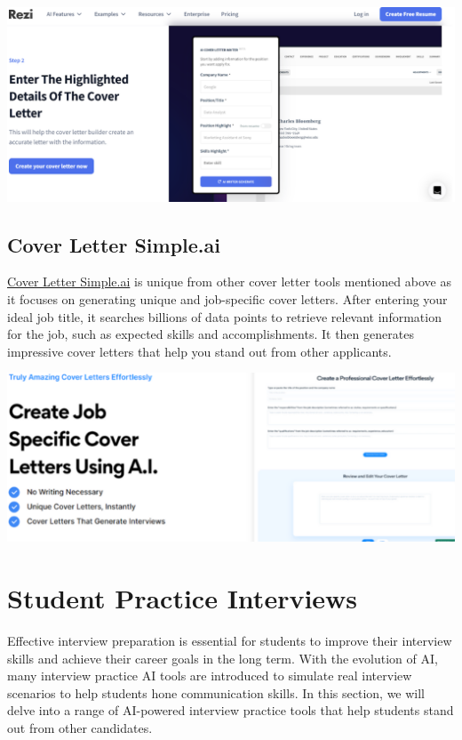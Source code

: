 \documentclass[
]{book}
\begin{document}
\includegraphics[width=5.5in,height=\textheight]{Rezi pic.png}

\hypertarget{cover-letter-simple.ai}{%
\section{Cover Letter Simple.ai}\label{cover-letter-simple.ai}}

\href{https://coverlettersimple.ai/}{Cover Letter Simple.ai} is unique from other cover letter tools mentioned above as it focuses on generating unique and job-specific cover letters. After entering your ideal job title, it searches billions of data points to retrieve relevant information for the job, such as expected skills and accomplishments. It then generates impressive cover letters that help you stand out from other applicants.

\includegraphics[width=6.80208in,height=\textheight]{coverlettsimpleai pic.png}

\hypertarget{student-practice-interviews}{%
\chapter{Student Practice Interviews}\label{student-practice-interviews}}

Effective interview preparation is essential for students to improve their interview skills and achieve their career goals in the long term. With the evolution of AI, many interview practice AI tools are introduced to simulate real interview scenarios to help students hone communication skills. In this section, we will delve into a range of AI-powered interview practice tools that help students stand out from other candidates.
\end{document}
